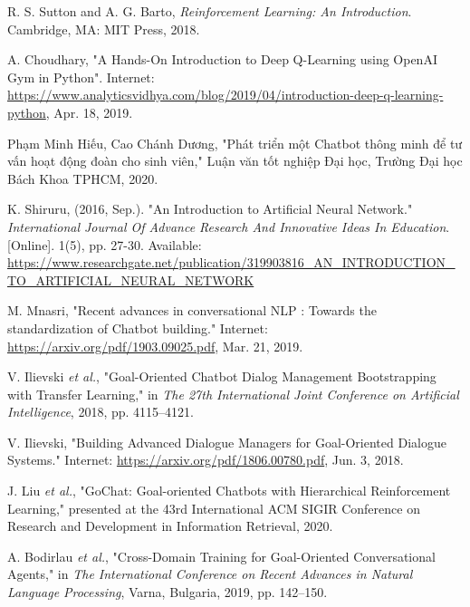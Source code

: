 \begin{thebibliography}{99}
R. S. Sutton and A. G. Barto, \textit{Reinforcement Learning: An Introduction}. Cambridge, MA: MIT Press, 2018.

A. Choudhary, "A Hands-On Introduction to Deep Q-Learning using OpenAI Gym in Python". Internet: \url{https://www.analyticsvidhya.com/blog/2019/04/introduction-deep-q-learning-python}, Apr. 18, 2019.

Phạm Minh Hiếu, Cao Chánh Dương, "Phát triển một Chatbot thông minh để tư vấn hoạt động đoàn cho sinh viên," Luận văn tốt nghiệp Đại học, Trường Đại học Bách Khoa TPHCM, 2020.

K. Shiruru, (2016, Sep.). "An Introduction to Artificial Neural Network." \textit{International Journal Of Advance Research And Innovative Ideas In Education}. [Online]. 1(5), pp. 27-30. Available: \url{https://www.researchgate.net/publication/319903816_AN_INTRODUCTION_TO_ARTIFICIAL_NEURAL_NETWORK}



M. Mnasri, "Recent advances in conversational NLP : Towards the standardization of Chatbot building." Internet: \url{https://arxiv.org/pdf/1903.09025.pdf}, Mar. 21, 2019.

V. Ilievski \textit{et al.}, "Goal-Oriented Chatbot Dialog Management Bootstrapping with Transfer Learning," in \textit{The 27th International Joint Conference on Artificial Intelligence}, 2018, pp. 4115–4121.

V. Ilievski, "Building Advanced Dialogue Managers for Goal-Oriented Dialogue Systems." Internet: \url{https://arxiv.org/pdf/1806.00780.pdf}, Jun. 3, 2018.

J. Liu \textit{et al.}, "GoChat: Goal-oriented Chatbots with Hierarchical Reinforcement Learning," presented at the 43rd International ACM SIGIR Conference on Research and Development in Information Retrieval, 2020.

A. Bodirlau \textit{et al.}, "Cross-Domain Training for Goal-Oriented Conversational Agents," in \textit{The International Conference on Recent Advances in Natural Language Processing}, Varna, Bulgaria, 2019, pp. 142–150.


\end{thebibliography}
